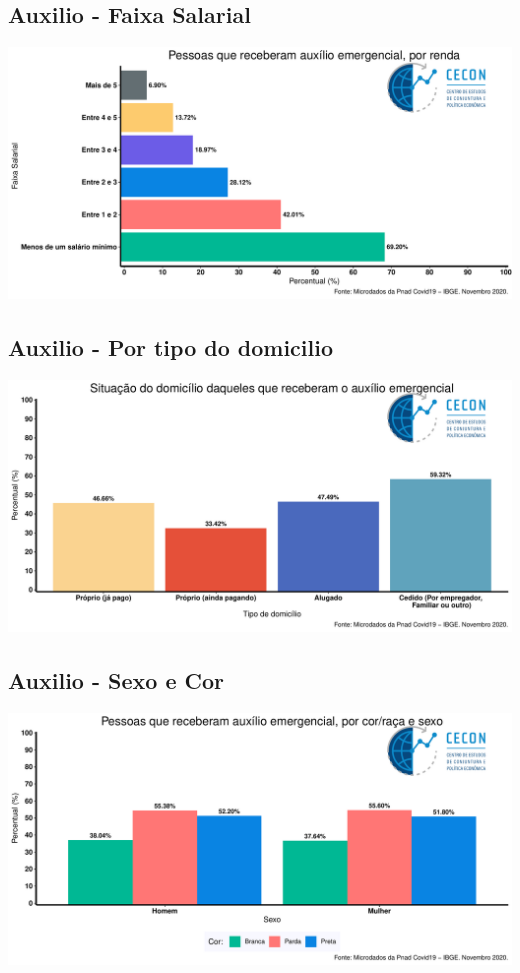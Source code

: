 \documentclass{SelfArx}
\begin{document}
\subsection*{Auxilio - Faixa Salarial}
\label{sec:orgafaef69}
\begin{center}
\includegraphics[width=.9\linewidth]{./figs/PNAD_COVID/auxilio_renda.pdf}
\end{center}
\subsection*{Auxilio - Por tipo do domicilio}
\label{sec:org9959cd9}
\begin{center}
\includegraphics[width=.9\linewidth]{./figs/PNAD_COVID/auxilio_domicilio.pdf}
\end{center}
\subsection*{Auxilio - Sexo e Cor}
\label{sec:org2cfed94}
\begin{center}
\includegraphics[width=.9\linewidth]{./figs/PNAD_COVID/auxilio_cor_sexo.pdf}
\end{center}
\end{document}
